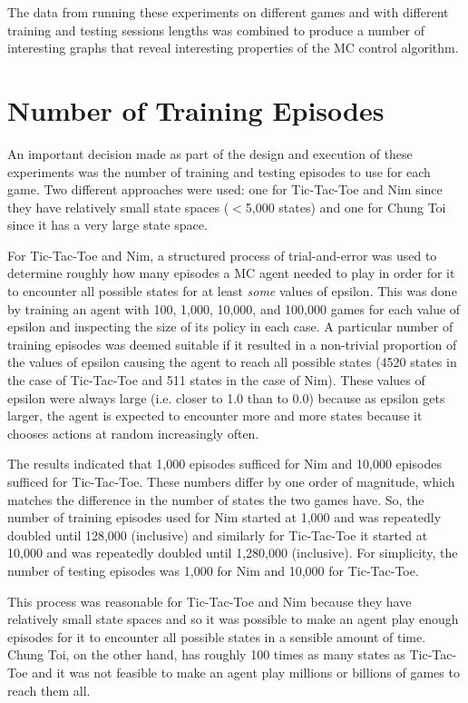 \documentclass[11pt,a4paper]{report}
\begin{document}
The data from running these experiments on different games and with different training and testing sessions lengths was combined to produce a number of interesting graphs that reveal interesting properties of the MC control algorithm.


\section{Number of Training Episodes}

An important decision made as part of the design and execution of these experiments was the number of training and testing episodes to use for each game. Two different approaches were used: one for Tic-Tac-Toe and Nim since they have relatively small state spaces ($<$5,000 states) and one for Chung Toi since it has a very large state space.

For Tic-Tac-Toe and Nim, a structured process of trial-and-error was used to determine roughly how many episodes a MC agent needed to play in order for it to encounter all possible states for at least \emph{some} values of epsilon. This was done by training an agent with 100, 1,000, 10,000, and 100,000 games for each value of epsilon and inspecting the size of its policy in each case. A particular number of training episodes was deemed suitable if it resulted in a non-trivial proportion of the values of epsilon causing the agent to reach all possible states (4520 states in the case of Tic-Tac-Toe and 511 states in the case of Nim). These values of epsilon were always large (i.e. closer to 1.0 than to 0.0) because as epsilon gets larger, the agent is expected to encounter more and more states because it chooses actions at random increasingly often.

The results indicated that 1,000 episodes sufficed for Nim and 10,000 episodes sufficed for Tic-Tac-Toe. These numbers differ by one order of magnitude, which matches the difference in the number of states the two games have. So, the number of training episodes used for Nim started at 1,000 and was repeatedly doubled until 128,000 (inclusive) and similarly for Tic-Tac-Toe it started at 10,000 and was repeatedly doubled until 1,280,000 (inclusive). For simplicity, the number of testing episodes was 1,000 for Nim and 10,000 for Tic-Tac-Toe.

This process was reasonable for Tic-Tac-Toe and Nim because they have relatively small state spaces and so it was possible to make an agent play enough episodes for it to encounter all possible states in a sensible amount of time. Chung Toi, on the other hand, has roughly 100 times as many states as Tic-Tac-Toe and it was not feasible to make an agent play millions or billions of games to reach them all.
\end{document}
